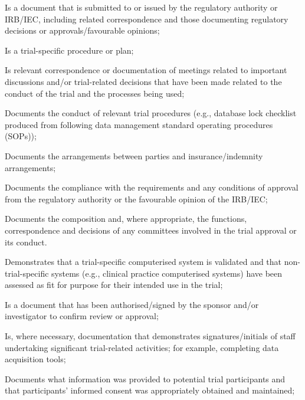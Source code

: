 \documentclass[11pt]{article}
\begin{document}
\begin{description}[leftmargin=2.5cm,style=sameline]

\item[(a)] Is a document that is submitted to or issued by the regulatory authority or IRB/IEC, including related correspondence and those documenting regulatory decisions or approvals/favourable opinions;

\item[(b)] Is a trial-specific procedure or plan;

\item[(c)] Is relevant correspondence or documentation of meetings related to important discussions and/or trial-related decisions that have been made related to the conduct of the trial and the processes being used;

\item[(d)] Documents the conduct of relevant trial procedures (e.g., database lock checklist produced from following data management standard operating procedures (SOPs));

\item[(e)] Documents the arrangements between parties and insurance/indemnity arrangements;

\item[(f)] Documents the compliance with the requirements and any conditions of approval from the regulatory authority or the favourable opinion of the IRB/IEC;

\item[(g)] Documents the composition and, where appropriate, the functions, correspondence and decisions of any committees involved in the trial approval or its conduct.

\item[(h)] Demonstrates that a trial-specific computerised system is validated and that non-trial-specific systems (e.g., clinical practice computerised systems) have been assessed as fit for purpose for their intended use in the trial;

\item[(i)] Is a document that has been authorised/signed by the sponsor and/or investigator to confirm review or approval;

\item[(j)] Is, where necessary, documentation that demonstrates signatures/initials of staff undertaking significant trial-related activities; for example, completing data acquisition tools;

\item[(k)] Documents what information was provided to potential trial participants and that participants' informed consent was appropriately obtained and maintained;


\end{description}
\end{document}
